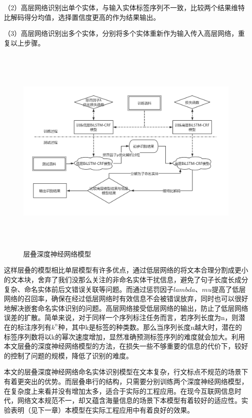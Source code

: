 \documentclass[winfonts,master,oneside,nobackinfo]{njuthesis}
\begin{document}
（2）高层网络识别出单个实体，与输入实体标签序列不一致，比较两个结果维特比解码得分均值，选择置信度更高的作为结果输出。

（3）高层网络识别出多个实体，分别将多个实体重新作为输入传入高层网络，重复以上步骤。



\begin{figure}[H]
\centering
\begin{minipage}[t]{\textwidth}
\includegraphics[width=1.1\textwidth,height=10.5cm]{./figure/层叠模型流程.jpg}
\caption{层叠深度神经网络模型}
\label{lab:1}
\end{minipage}
\end{figure}

这样层叠的模型相比单层模型有许多优点，通过低层网络的将文本合理分割成更小的文本块，舍弃了我们没那么关注的非命名实体干扰信息，避免了句子长度长成分复杂、命名实体前后文错误关联等问题。而通过惩罚因子$lambda$、$mu$提高了低层网络的召回率，确保在经过低层网络时有效信息不会被错误放弃，同时也可以很好地解决嵌套命名实体识别的问题。高层网络接受低层网络的输出，防止了低层网络误差的扩散。简单来说，对于同样一个序列标注任务而言，若序列长度为n，则潜在的标注序列有$k^n$种，其中k是标签的种类数。那么当序列长度n越大时，潜在的标签序列数将以k的幂次速度增加，显然准确预测标签序列的难度就会加大。利用本文层叠的深度神经网络模型的方法，在损失一些不够重要的信息的代价下，较好的控制了问题的规模，降低了识别的难度。

本文的层叠深度神经网络命名实体识别模型在文本复杂，行文标点不规范的场景下有着更突出的优势。而层叠串行的结构，只需要分别训练两个深度神经网络模型，在复杂度上来看并没有增加太多，适合于实际的工程应用。在现今互联网信息时代，网络文本规范不一，却又蕴含海量信息的场景下本模型有着较好的适应性。实验表明（见下一章）本模型在实际工程应用中有着良好的效果。
\end{document}
